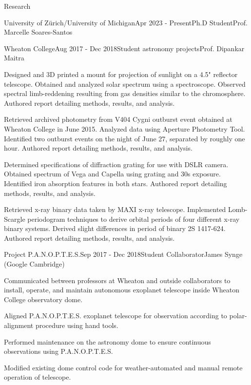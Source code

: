 \documentclass{resume} %
\begin{document}
\begin{rSection}{Research}
\begin{rSubsection}{University of Zürich/University of Michigan}{Apr 2023 - Present}{Ph.D Student}{Prof. Marcelle Soares-Santos}
\begin{rSubsection}{Wheaton College}{Aug 2017 - Dec 2018}{Student astronomy projects}{Prof. Dipankar Maitra}
\item Designed and 3D printed a mount for projection of sunlight on a 4.5" reflector telescope. Obtained and analyzed solar spectrum using a spectroscope. Observed spectral limb-reddening resulting from gas densities similar to the chromosphere. Authored report detailing methods, results, and analysis.
\item Retrieved archived photometry from V404 Cygni outburst event obtained at Wheaton College in June 2015. Analyzed data using Aperture Photometry Tool. Identified two outburst events on the night of June 27, separated by roughly one hour. Authored report detailing methods, results, and analysis.
\item Determined specifications of diffraction grating for use with DSLR camera. Obtained spectrum of Vega and Capella using grating and 30s exposure. Identified iron absorption features in both stars. Authored report detailing methods, results, and analysis.
\item Retrieved x-ray binary data taken by MAXI x-ray telescope. Implemented Lomb-Scargle periodogram techniques to derive orbital periods of four different x-ray binary systems. Derived slight differences in period of binary 2S 1417-624. Authored report detailing methods, results, and analysis.
\end{rSubsection}

\newpage

\begin{rSubsection}{Project P.A.N.O.P.T.E.S.}{Sep 2017 - Dec 2018}{Student Collaborator}{James Synge (Google Cambridge)}
\item Communicated between professors at Wheaton and outside collaborators to install, operate, and maintain autonomous exoplanet telescope inside Wheaton College observatory dome.
\item Aligned P.A.N.O.P.T.E.S. exoplanet telescope for observation according to polar-alignment procedure using hand tools.
\item Performed maintenance on the astronomy dome to ensure continuous observations using P.A.N.O.P.T.E.S.
\item Modified existing dome control code for weather-automated and manual remote operation of telescope.
\end{rSubsection}



\end{rSubsection}
\end{rSection}
\end{document}
